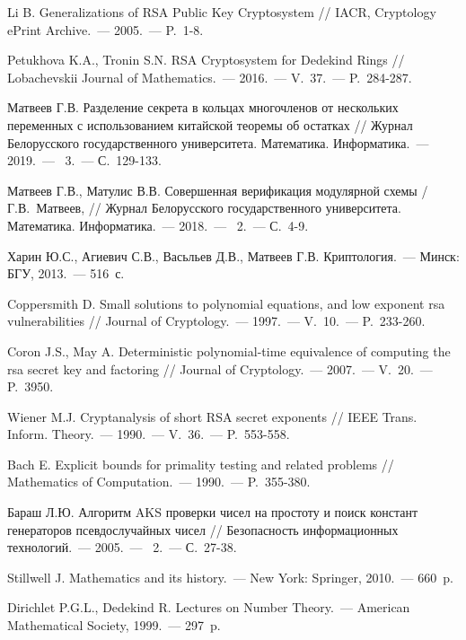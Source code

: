 \documentclass[_00_dissertation.tex]{subfiles}
\begin{document}
\begin{thebibliography}{99}
    Li B. Generalizations of RSA Public Key Cryptosystem // IACR, Cryptology ePrint Archive.~--- 2005.~--- P.~1-8.

    Petukhova K.A., Tronin S.N. RSA Cryptosystem for Dedekind Rings // Lobachevskii Journal of Mathematics.~--- 2016.~--- V.~37.~--- P.~284-287.

    Матвеев Г.В. Разделение секрета в кольцах многочленов от нескольких переменных с использованием китайской теоремы об остатках // Журнал Белорусского государственного университета. Математика. Информатика.~--- 2019.~--- \textnumero~3.~--- С.~129-133.

    Матвеев Г.В., Матулис В.В. Совершенная верификация модулярной схемы / Г.В.~Матвеев,  // Журнал Белорусского государственного университета. Математика. Информатика.~--- 2018.~--- \textnumero~2.~--- С.~4-9.

    Харин Ю.С., Агиевич С.В., Васьльев Д.В., Матвеев Г.В. Криптология.~--- Минск: БГУ, 2013.~--- 516~с.

    Coppersmith D. Small solutions to polynomial equations, and low exponent rsa vulnerabilities // Journal of Cryptology.~--- 1997.~--- V.~10.~--- P.~233-260.

    Coron J.S., May A. Deterministic polynomial-time equivalence of computing the rsa secret key and factoring // Journal of Cryptology.~--- 2007.~--- V.~20.~--- P.~3950.

    Wiener M.J. Cryptanalysis of short RSA secret exponents // IEEE Trans. Inform. Theory.~--- 1990.~--- V.~36.~--- P.~553-558.

    Bach E. Explicit bounds for primality testing and related problems // Mathematics of Computation.~--- 1990.~--- P.~355-380.

    Бараш Л.Ю. Алгоритм AKS проверки чисел на простоту и поиск констант генераторов псевдослучайных чисел // Безопасность информационных технологий.~--- 2005.~--- \textnumero~2.~--- С.~27-38.

    Stillwell J. Mathematics and its history.~--- New York: Springer, 2010.~--- 660~p.

    Dirichlet P.G.L., Dedekind R. Lectures on Number Theory.~--- American Mathematical Society, 1999.~--- 297~p.


\end{thebibliography}
\end{document}
